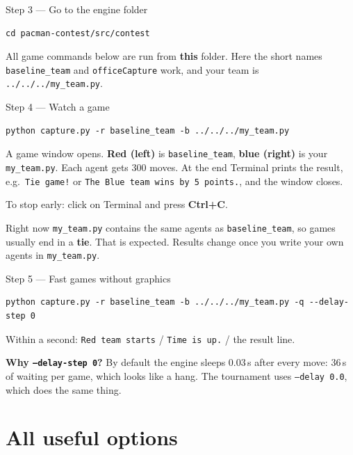 \documentclass[11pt,a4paper]{article}
\newcommand{\p}[1]{\nolinkurl{#1}}  %
\begin{document}
\begin{step}{Step 3 --- Go to the engine folder}
\begin{lstlisting}
cd pacman-contest/src/contest
\end{lstlisting}
All game commands below are run from \textbf{this} folder. Here the short names \texttt{baseline\_team} and
\texttt{officeCapture} work, and your team is \p{../../../my_team.py}.
\end{step}

\begin{step}{Step 4 --- Watch a game}
\begin{lstlisting}
python capture.py -r baseline_team -b ../../../my_team.py
\end{lstlisting}
\begin{expect}
A game window opens. \textbf{Red (left)} is \texttt{baseline\_team}, \textbf{blue (right)} is your \texttt{my\_team.py}.
Each agent gets 300 moves. At the end Terminal prints the result, e.g.\ \texttt{Tie game!} or
\texttt{The Blue team wins by 5 points.}, and the window closes.
\end{expect}
To stop early: click on Terminal and press \textbf{Ctrl+C}.
\end{step}

\begin{careful}
Right now \texttt{my\_team.py} contains the same agents as \texttt{baseline\_team}, so games usually end in a \textbf{tie}.
That is expected. Results change once you write your own agents in \texttt{my\_team.py}.
\end{careful}

\begin{step}{Step 5 --- Fast games without graphics}
\begin{lstlisting}
python capture.py -r baseline_team -b ../../../my_team.py -q --delay-step 0
\end{lstlisting}
\begin{expect}
Within a second: \texttt{Red team starts} / \texttt{Time is up.} / the result line.
\end{expect}
\textbf{Why \texttt{--delay-step 0}?} By default the engine sleeps 0.03\,s after every move: 36\,s of waiting per game,
which looks like a hang. The tournament uses \texttt{--delay 0.0}, which does the same thing.
\end{step}

\section{All useful options}
\end{document}
